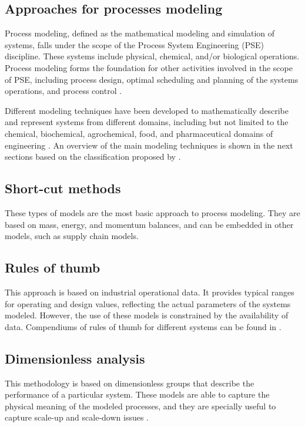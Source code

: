 \begin{refsection}[referencesCh1]
\section{Approaches for processes modeling}
Process modeling, defined as the mathematical modeling and simulation of systems, falls under the scope of the Process System Engineering (PSE) discipline. These systems include physical, chemical, and/or biological operations. Process modeling forms the foundation for other activities involved in the scope of PSE, including process design, optimal scheduling and planning of the systems operations, and process control \citep{STEPHANOPOULOS20114272}.

Different modeling techniques have been developed to mathematically describe and represent systems from different domains, including but not limited to the chemical, biochemical, agrochemical, food, and pharmaceutical domains of engineering \citep{PISTIKOPOULOS2021107252}. An overview of the main modeling techniques is shown in the next sections based on the classification proposed by \citet{MARTIN201216}.

\subsection{Short-cut methods}
These types of models are the most basic approach to process modeling. They are based on mass, energy, and momentum balances, and can be embedded in other models, such as supply chain models.

\subsection{Rules of thumb}
This approach is based on industrial operational data. It provides typical ranges for operating and design values, reflecting the actual parameters of the systems modeled. However, the use of these models is constrained by the availability of data. Compendiums of rules of thumb for different systems can be found in \citet{couper2005chemical, hall2012rules, sadhukhan2014biorefineries}.

\subsection{Dimensionless analysis}
This methodology is based on dimensionless groups that describe the performance of a particular system. These models are able to capture the physical meaning of the modeled processes, and they are specially useful to capture scale-up and scale-down issues \citep{szirtes2007applied}.


\end{refsection}
